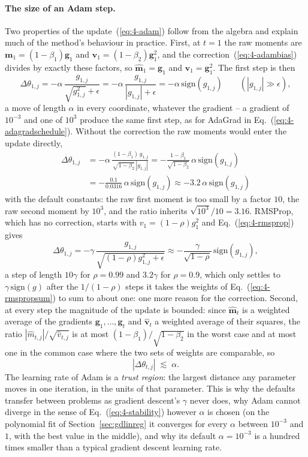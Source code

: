 \paragraph{The size of an Adam step.}
Two properties of the update~(\ref{eq:4-adam}) follow from the algebra and
explain much of the method's behaviour in practice.  First, at $t=1$ the
raw moments are $\bm{m}_1=(1-\beta_1)\bm{g}_1$ and
$\bm{v}_1=(1-\beta_2)\bm{g}_1^{2}$, and the correction~(\ref{eq:4-adambias})
divides by exactly these factors, so $\hat{\bm{m}}_1=\bm{g}_1$ and
$\hat{\bm{v}}_1=\bm{g}_1^{2}$.  The first step is then
\[
  \Delta\theta_{1,j}=-\alpha\,\frac{g_{1,j}}{\sqrt{g_{1,j}^{2}}+\epsilon}
  =-\alpha\,\frac{g_{1,j}}{|g_{1,j}|+\epsilon}
  =-\alpha\,\mathrm{sign}(g_{1,j})\qquad(|g_{1,j}|\gg\epsilon),
\]
a move of length $\alpha$ in every coordinate, whatever the gradient -- a
gradient of $10^{-3}$ and one of $10^{3}$ produce the same first step, as for
AdaGrad in Eq.~(\ref{eq:4-adagradschedule}).  Without the correction the raw
moments would enter the update directly,
\begin{align*}
  \Delta\theta_{1,j}&=-\alpha\,\frac{(1-\beta_1)\,g_{1,j}}{\sqrt{1-\beta_2}\,|g_{1,j}|}
  =-\frac{1-\beta_1}{\sqrt{1-\beta_2}}\,\alpha\,\mathrm{sign}(g_{1,j})\\
  &=-\frac{0.1}{0.0316}\,\alpha\,\mathrm{sign}(g_{1,j})\approx-3.2\,\alpha\,\mathrm{sign}(g_{1,j})
\end{align*}
with the default constants: the raw first moment is too small by a factor
$10$, the raw second moment by $10^{3}$, and the ratio inherits
$\sqrt{10^{3}}/10=3.16$.  RMSProp, which has no correction, starts with
$v_1=(1-\rho)g_1^{2}$ and Eq.~(\ref{eq:4-rmsprop}) gives
\[
  \Delta\theta_{1,j}=-\gamma\,\frac{g_{1,j}}{\sqrt{(1-\rho)g_{1,j}^{2}+\epsilon}}
  \approx-\frac{\gamma}{\sqrt{1-\rho}}\,\mathrm{sign}(g_{1,j}),
\]
a step of length $10\gamma$ for $\rho=0.99$ and $3.2\gamma$ for $\rho=0.9$,
which only settles to $\gamma\,\mathrm{sign}(g)$ after the $1/(1-\rho)$ steps
it takes the weights of Eq.~(\ref{eq:4-rmspropsum}) to sum to about one: one
more reason for the correction.  Second, at
every step the magnitude of the update is bounded: since $\hat{\bm{m}}_t$ is
a weighted average of the gradients $\bm{g}_1,\dots,\bm{g}_t$ and
$\hat{\bm{v}}_t$ a weighted average of their squares, the ratio
$|\hat m_{t,j}|/\sqrt{\hat v_{t,j}}$ is at most $(1-\beta_1)/\sqrt{1-\beta_2}$
in the worst case and at most one in the common case where the two sets of
weights are comparable, so
\begin{equation}
  |\Delta\theta_{t,j}|\;\lesssim\;\alpha .
  \label{eq:4-adambound}
\end{equation}
The learning rate of Adam is a \emph{trust region}: the largest distance any
parameter moves in one iteration, in the units of that parameter.  This is
why the defaults transfer between problems as gradient descent's $\gamma$
never does, why Adam cannot diverge in the sense of Eq.~(\ref{eq:4-stability})
however $\alpha$ is chosen (on the polynomial fit of
Section~\ref{sec:gdlinreg} it converges for every $\alpha$ between $10^{-3}$
and $1$, with the best value in the middle), and why its default
$\alpha=10^{-3}$ is a hundred times smaller than a typical gradient descent
learning rate.

